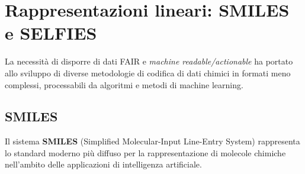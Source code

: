 \section{Rappresentazioni lineari: SMILES e SELFIES}
La necessità di disporre di dati FAIR e \textit{machine readable/actionable} ha portato allo sviluppo di diverse metodologie di codifica di dati chimici in formati meno complessi, processabili da algoritmi e metodi di machine learning.
\subsection{SMILES}
Il sistema \textbf{SMILES} (Simplified Molecular-Input Line-Entry System) rappresenta lo standard moderno più diffuso per la rappresentazione di molecole chimiche nell'ambito delle applicazioni di intelligenza artificiale.

